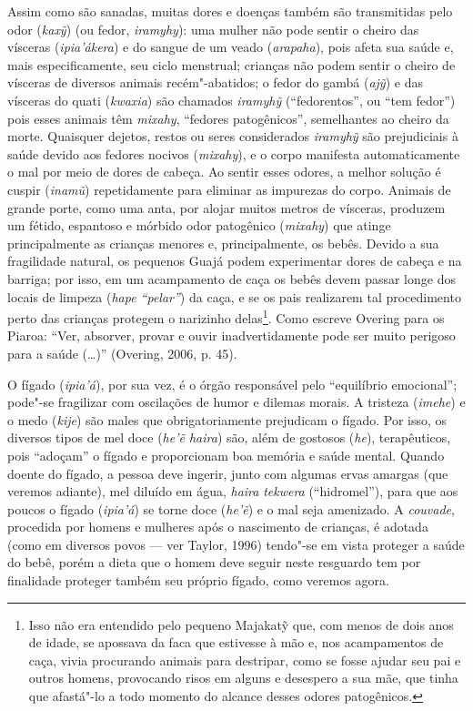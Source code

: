 Assim como são sanadas, muitas dores e doenças também são transmitidas
pelo odor (\emph{kaxỹ}) (ou fedor, \emph{iramyhy}): uma mulher não pode
sentir o cheiro das vísceras (\emph{ipia'ákera}) e do sangue de um veado
(\emph{arapaha}), pois afeta sua saúde e, mais especificamente, seu
ciclo menstrual; crianças não podem sentir o cheiro de vísceras de
diversos animais recém"-abatidos; o fedor do gambá (\emph{ajỹ}) e das
vísceras do quati (\emph{kwaxia}) são chamados \emph{iramyhỹ}
(``fedorentos'', ou ``tem fedor'') pois esses animais têm \emph{mixahy},
``fedores patogênicos'', semelhantes ao cheiro da morte. Quaisquer
dejetos, restos ou seres considerados \emph{iramyhỹ} são prejudiciais à
saúde devido aos fedores nocivos (\emph{mixahy}), e o corpo manifesta
automaticamente o mal por meio de dores de cabeça. Ao sentir esses
odores, a melhor solução é cuspir (\emph{inamũ}) repetidamente para
eliminar as impurezas do corpo. Animais de grande porte, como uma anta,
por alojar muitos metros de vísceras, produzem um fétido, espantoso e
mórbido odor patogênico (\emph{mixahy}) que atinge principalmente as
crianças menores e, principalmente, os bebês. Devido a sua fragilidade
natural, os pequenos Guajá podem experimentar dores de cabeça e na
barriga; por isso, em um acampamento de caça os bebês devem passar longe
dos locais de limpeza (\emph{hape ``pelar''}) da caça, e se os pais
realizarem tal procedimento perto das crianças protegem o narizinho
delas\footnote{Isso não era entendido pelo pequeno Majakatỹ que, com
  menos de dois anos de idade, se apossava da faca que estivesse à mão
  e, nos acampamentos de caça, vivia procurando animais para destripar,
  como se fosse ajudar seu pai e outros homens, provocando risos em
  alguns e desespero a sua mãe, que tinha que afastá"-lo a todo momento
  do alcance desses odores patogênicos.}. Como escreve Overing para os
Piaroa: ``Ver, absorver, provar e ouvir inadvertidamente pode ser muito
perigoso para a saúde (\ldots{})'' (Overing, 2006, p. 45).

O fígado (\emph{ipia'á}), por sua vez, é o órgão responsável pelo
``equilíbrio emocional''; pode"-se fragilizar com oscilações de humor e
dilemas morais. A tristeza (\emph{imehe}) e o medo (\emph{kije}) são
males que obrigatoriamente prejudicam o fígado. Por isso, os diversos
tipos de mel doce (\emph{he'ẽ haira}) são, além de gostosos (\emph{he}),
terapêuticos, pois ``adoçam'' o fígado e proporcionam boa memória e saúde
mental. Quando doente do fígado, a pessoa deve ingerir, junto com
algumas ervas amargas (que veremos adiante), mel diluído em água,
\emph{haira} \emph{tekwera} (``hidromel''), para que aos poucos o fígado
(\emph{ipia'á}) se torne doce (\emph{he'ẽ}) e o mal seja amenizado. A
\emph{couvade}, procedida por homens e mulheres após o nascimento de
crianças, é adotada (como em diversos povos --- ver Taylor, 1996) tendo"-se
em vista proteger a saúde do bebê, porém a dieta que o homem deve seguir
neste resguardo tem por finalidade proteger também seu próprio fígado,
como veremos agora.

